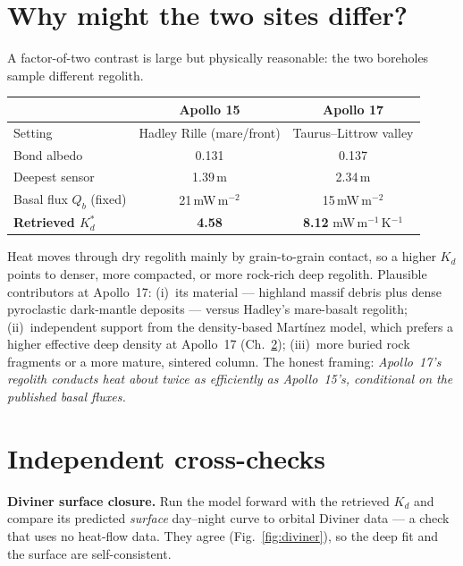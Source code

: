 \documentclass[11pt]{report}
\begin{document}
\chapter{Why might the two sites differ?}\label{ch:sites}\label{sec:sites}
A factor-of-two contrast is large but physically reasonable: the two boreholes
sample different regolith.

\begin{center}\small
\begin{tabular}{@{}lcc@{}}
\toprule
 & \textbf{Apollo 15} & \textbf{Apollo 17} \\
\midrule
Setting & Hadley Rille (mare/front) & Taurus--Littrow valley \\
Bond albedo & 0.131 & 0.137 \\
Deepest sensor & 1.39\,m & 2.34\,m \\
Basal flux $Q_b$ (fixed) & 21\,mW\,m$^{-2}$ & 15\,mW\,m$^{-2}$ \\
\textbf{Retrieved $K_d^{*}$} & \textbf{4.58} & \textbf{8.12} mW\,m$^{-1}$\,K$^{-1}$ \\
\bottomrule
\end{tabular}
\end{center}

Heat moves through dry regolith mainly by grain-to-grain contact, so a higher
$K_d$ points to denser, more compacted, or more rock-rich deep regolith. Plausible
contributors at Apollo~17: (i)~its material --- highland massif debris plus dense
pyroclastic dark-mantle deposits --- versus Hadley's mare-basalt regolith;
(ii)~independent support from the density-based Mart\'inez model, which prefers a
higher effective deep density at Apollo~17 (Ch.~\ref{ch:crosschecks}); (iii)~more
buried rock fragments or a more mature, sintered column. The honest framing:
\emph{Apollo~17's regolith conducts heat about twice as efficiently as Apollo~15's,
conditional on the published basal fluxes.}

\chapter{Independent cross-checks}\label{ch:crosschecks}
\textbf{Diviner surface closure.} Run the model forward with the retrieved $K_d$
and compare its predicted \emph{surface} day--night curve to orbital Diviner
data --- a check that uses no heat-flow data. They agree
(Fig.~\ref{fig:diviner}), so the deep fit and the surface are self-consistent.
\end{document}
